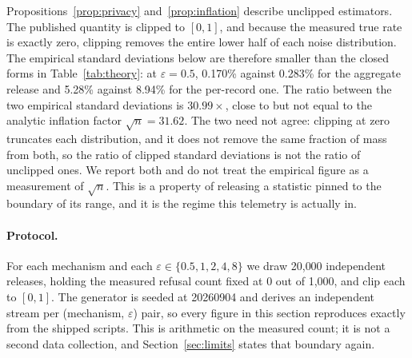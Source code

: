 \documentclass[journal]{IEEEtran}
\theoremstyle{definition}
\newcommand{\Nrec}{1{,}000}
\newcommand{\Nrefused}{0}
\newcommand{\Trials}{20{,}000}
\newcommand{\Seed}{20260904}
\newcommand{\LapSDhalf}{0.170}
\newcommand{\PerSDhalf}{5.28}
\newcommand{\SDratio}{30.99}
\newcommand{\SqrtN}{31.62}
\newcommand{\LapSDtheoryhalf}{0.283}
\newcommand{\PerSDtheoryhalf}{8.94}
\begin{document}
Propositions~\ref{prop:privacy} and~\ref{prop:inflation} describe unclipped
estimators. The published quantity is clipped to $[0,1]$, and because the
measured true rate is exactly zero, clipping removes the entire lower half of
each noise distribution. The empirical standard deviations below are therefore
smaller than the closed forms in Table~\ref{tab:theory}: at $\varepsilon=0.5$,
\LapSDhalf\% against \LapSDtheoryhalf\% for the aggregate release and
\PerSDhalf\% against \PerSDtheoryhalf\% for the per-record one. The ratio between
the two empirical standard deviations is $\SDratio\times$, close to but not equal
to the analytic inflation factor $\sqrt{n} = \SqrtN$. The two need not agree:
clipping at zero truncates each distribution, and it does not remove the same
fraction of mass from both, so the ratio of clipped standard deviations is not
the ratio of unclipped ones. We report both and do not treat the empirical
figure as a measurement of $\sqrt{n}$. This is a property of releasing a
statistic pinned to the boundary of its range, and it is the regime this
telemetry is actually in.

\paragraph{Protocol.} For each mechanism and each
$\varepsilon \in \{0.5, 1, 2, 4, 8\}$ we draw \Trials{} independent releases,
holding the measured refusal count fixed at \Nrefused{} out of \Nrec{}, and
clip each to $[0,1]$. The generator is seeded at \Seed{} and derives an
independent stream per (mechanism, $\varepsilon$) pair, so every figure in this
section reproduces exactly from the shipped scripts. This is arithmetic on the
measured count; it is not a second data collection, and
Section~\ref{sec:limits} states that boundary again.
\end{document}

